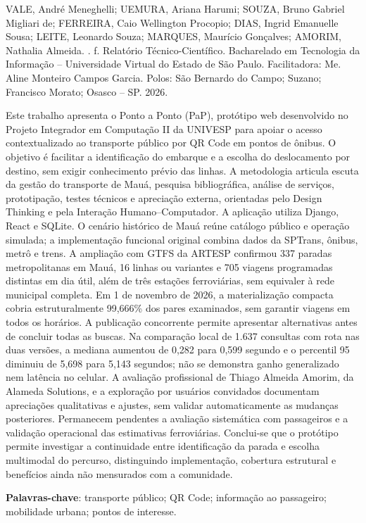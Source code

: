 \documentclass[12pt,oneside,a4paper,brazil,chapter=TITLE]{abntex2}
\begin{document}
\begin{resumo}
\SingleSpacing
\noindent VALE, André Meneghelli; UEMURA, Ariana Harumi; SOUZA, Bruno Gabriel Migliari de; FERREIRA, Caio Wellington Procopio; DIAS, Ingrid Emanuelle Sousa; LEITE, Leonardo Souza; MARQUES, Maurício Gonçalves; AMORIM, Nathalia Almeida. \textit{\imprimirtitulo}. \ztotpages{} f. Relatório Técnico-Científico. Bacharelado em Tecnologia da Informação -- Universidade Virtual do Estado de São Paulo. Facilitadora: Me. Aline Monteiro Campos Garcia. Polos: São Bernardo do Campo; Suzano; Francisco Morato; Osasco -- SP. 2026.
\par\medskip
Este trabalho apresenta o Ponto a Ponto (PaP), protótipo web desenvolvido no Projeto Integrador em Computação II da UNIVESP para apoiar o acesso contextualizado ao transporte público por QR Code em pontos de ônibus. O objetivo é facilitar a identificação do embarque e a escolha do deslocamento por destino, sem exigir conhecimento prévio das linhas. A metodologia articula escuta da gestão do transporte de Mauá, pesquisa bibliográfica, análise de serviços, prototipação, testes técnicos e apreciação externa, orientadas pelo Design Thinking e pela Interação Humano--Computador. A aplicação utiliza Django, React e SQLite. O cenário histórico de Mauá reúne catálogo público e operação simulada; a implementação funcional original combina dados da SPTrans, ônibus, metrô e trens. A ampliação com GTFS da ARTESP confirmou 337 paradas metropolitanas em Mauá, 16 linhas ou variantes e 705 viagens programadas distintas em dia útil, além de três estações ferroviárias, sem equivaler à rede municipal completa. Em 1 de novembro de 2026, a materialização compacta cobria estruturalmente 99,666\% dos pares examinados, sem garantir viagens em todos os horários. A publicação concorrente permite apresentar alternativas antes de concluir todas as buscas. Na comparação local de 1.637 consultas com rota nas duas versões, a mediana aumentou de 0,282 para 0,599 segundo e o percentil 95 diminuiu de 5,698 para 5,143 segundos; não se demonstra ganho generalizado nem latência no celular. A avaliação profissional de Thiago Almeida Amorim, da Alameda Solutions, e a exploração por usuários convidados documentam apreciações qualitativas e ajustes, sem validar automaticamente as mudanças posteriores. Permanecem pendentes a avaliação sistemática com passageiros e a validação operacional das estimativas ferroviárias. Conclui-se que o protótipo permite investigar a continuidade entre identificação da parada e escolha multimodal do percurso, distinguindo implementação, cobertura estrutural e benefícios ainda não mensurados com a comunidade.

\par\vfill
\noindent\textbf{Palavras-chave}: transporte público; QR Code; informação ao passageiro; mobilidade urbana; pontos de interesse.
\end{resumo}
\begingroup
\SingleSpacing
\setlength{\beforechapskip}{0pt}
\setlength{\afterchapskip}{6pt}
\setlength{\cftbeforechapterskip}{2pt}
\setpnumwidth{2em}
\setrmarg{3em}
\setlength{\cftbeforesubsectionskip}{-1.8pt}
\tableofcontents*
\endgroup
\cleardoublepage
\end{document}

